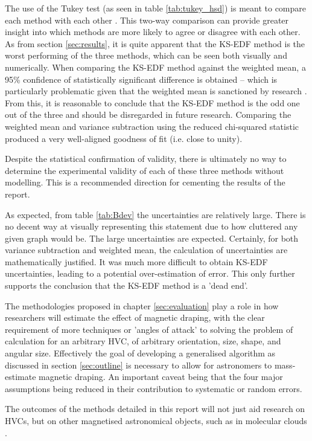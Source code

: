 The use of the Tukey test (as seen in table \ref{tab:tukey_hsd}) is meant to compare each method with each other \citep{ID77, ID78}. This two-way comparison can provide greater insight into which methods are more likely to agree or disagree with each other. As from section \ref{sec:results}, it is quite apparent that the KS-EDF method is the worst performing of the three methods, which can be seen both visually and numerically. When comparing the KS-EDF method against the weighted mean, a 95\% confidence of statistically significant difference is obtained – which is particularly problematic given that the weighted mean is sanctioned by research \citep{ID5, ID26}. From this, it is reasonable to conclude that the KS-EDF method is the odd one out of the three and should be disregarded in future research. Comparing the weighted mean and variance subtraction using the reduced chi-squared statistic produced a very well-aligned goodness of fit (i.e. close to unity).


Despite the statistical confirmation of validity, there is ultimately no way to determine the experimental validity of each of these three methods without modelling. This is a recommended direction for cementing the results of the report.


As expected, from table \ref{tab:Bdev} the uncertainties are relatively large. There is no decent way at visually representing this statement due to how cluttered any given graph would be. The large uncertainties are expected. Certainly, for both variance subtraction and weighted mean, the calculation of uncertainties are mathematically justified. It was much more difficult to obtain KS-EDF uncertainties, leading to a potential over-estimation of error. This only further supports the conclusion that the KS-EDF method is a 'dead end'.


The methodologies proposed in chapter \ref{sec:evaluation} play a role in how researchers will estimate the effect of magnetic draping, with the clear requirement of more techniques or 'angles of attack' to solving the problem of calculation for an arbitrary HVC, of arbitrary orientation, size, shape, and angular size. Effectively the goal of developing a generalised algorithm as discussed in section \ref{sec:outline} is necessary to allow for astronomers to mass-estimate magnetic draping. An important caveat being that the four major assumptions being reduced in their contribution to systematic or random errors.

The outcomes of the methods detailed in this report will not just aid research on HVCs, but on other magnetised astronomical objects, such as in molecular clouds \citep{ID70}.